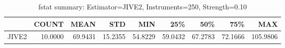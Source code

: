 \begin{table}[ht]
\centering
\caption{fstat summary: Estimator=JIVE2, Instruments=250, Strength=0.10}
\begin{tabular}{lrrrrrrrr}
\toprule
 & COUNT & MEAN & STD & MIN & 25\% & 50\% & 75\% & MAX \\
\midrule
JIVE2 & 10.0000 & 69.9431 & 15.2355 & 54.8229 & 59.0432 & 67.2783 & 72.1666 & 105.9806 \\
\bottomrule
\end{tabular}
\end{table}
